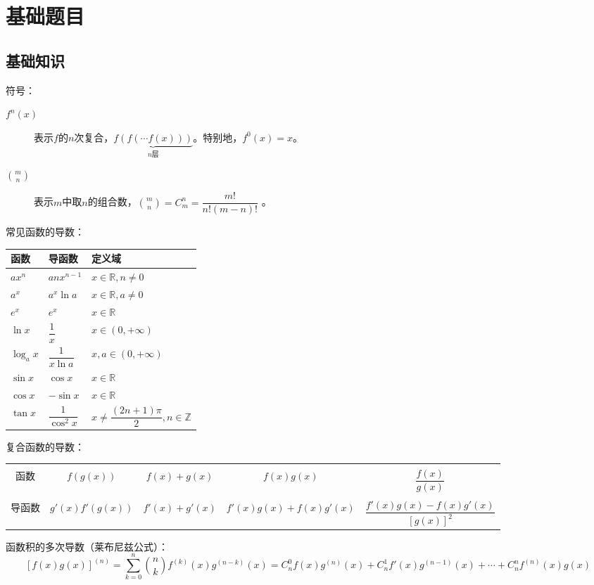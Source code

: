 \setchapterpreamble[u]{\margintoc}
\chapter{基础题目}
\section{基础知识}
符号：
\begin{description}
	\item[$f^n(x)$] 表示$f$的$n$次复合，$\underbrace{f(f(\cdots f(x)))}_{n\text{层}}$。特别地，$f^0(x)=x$。 
	\item[$\binom{m}{n}$] 表示$m$中取$n$的组合数，$\binom{m}{n}=C_m^n=\dfrac{m!}{n!(m-n)!}$ 。
\end{description}
常见函数的导数：\\
\begin{center}
	\begin{tabular}{lll}
		\hline
		函数&导函数&定义域\\
		\hline
		$ax^n$&$anx^{n-1}$&$x\in\mathbb{R},n\neq 0$\\
		$a^x$&$a^x\ln a$&$x \in \mathbb{R},a\neq 0$\\
		$e^x$&$e^x$&$x \in \mathbb{R}$\\
		$\ln x$&$\dfrac{1}{x}$&$x \in (0,+\infty)$\\
		$\log_a{x}$&$\dfrac{1}{x\ln a}$&$x,a \in (0,+\infty)$\\
		$\sin x$&$\cos x$&$x\in \mathbb{R}$\\
		$\cos x$&$-\sin x$&$x\in \mathbb{R}$\\
		$\tan x$&$\dfrac{1}{\cos^2 x}$&$x \neq \dfrac{(2n+1)\pi}{2}, n \in \mathbb{Z}$\\[0.5em]
		\hline
	\end{tabular} 
\end{center}
复合函数的导数：\par\vspace{1em}
\begin{tabular}{ccccc}
	\hline\\[-1em]
	函数&$f(g(x))$&$f(x)+g(x)$&$f(x)g(x)$&$\dfrac{f(x)}{g(x)}$\\[1em]
	\hline\\[-1em]
	导函数&$g'(x)f'(g(x))$&$f'(x)+g'(x)$&$f'(x)g(x)+f(x)g'(x)$&$\dfrac{f'(x)g(x)-f(x)g'(x)}{[g(x)]^2}$\\[1em]
	\hline
\end{tabular}\par\vspace{1em}
函数积的多次导数（莱布尼兹公式）：
$$\left[f(x)g(x)\right]^{(n)}=\sum_{k=0}^n \binom{n}{k} f^{(k)}(x)g^{(n-k)}(x)=C_n^0f(x)g^{(n)}(x)+C_n^1f'(x)g^{(n-1)}(x)+\cdots+C_n^nf^{(n)}(x)g(x)$$
